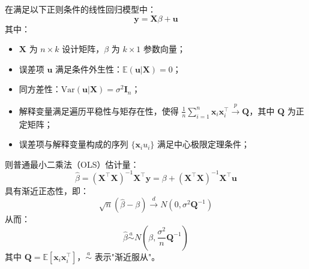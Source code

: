 \begin{theorem}[大样本OLS估计量的渐近正态性]
在满足以下正则条件的线性回归模型中：
\begin{equation}
\mathbf{y} = \mathbf{X}\beta + \mathbf{u}
\end{equation}
其中：
\begin{itemize}
    \item $\mathbf{X}$ 为 $n \times k$ 设计矩阵，$\beta$ 为 $k \times 1$ 参数向量；
    \item 误差项 $\mathbf{u}$ 满足条件外生性：$\mathbb{E}(\mathbf{u}|\mathbf{X}) = 0$；
    \item 同方差性：$\text{Var}(\mathbf{u}|\mathbf{X}) = \sigma^2 \mathbf{I}_n$；
    \item 解释变量满足遍历平稳性与矩存在性，使得 $\frac{1}{n} \sum_{i=1}^n \mathbf{x}_i \mathbf{x}_i^\top \overset{p}{\to} \mathbf{Q}$，其中 $\mathbf{Q}$ 为正定矩阵；
    \item 误差项与解释变量构成的序列 $\{\mathbf{x}_i u_i\}$ 满足中心极限定理条件；
\end{itemize}

则普通最小二乘法（OLS）估计量：
\begin{equation}
\hat{\beta} = (\mathbf{X}^\top \mathbf{X})^{-1} \mathbf{X}^\top \mathbf{y} = \beta + (\mathbf{X}^\top \mathbf{X})^{-1} \mathbf{X}^\top \mathbf{u}
\end{equation}
具有渐近正态性，即：
\begin{equation}
\sqrt{n}(\hat{\beta} - \beta) \overset{d}{\to} N(0, \sigma^2 \mathbf{Q}^{-1})
\end{equation}
从而：
\begin{equation}
\hat{\beta} \overset{a}{\sim} N\left( \beta, \frac{\sigma^2}{n} \mathbf{Q}^{-1} \right)
\end{equation}
其中 $\mathbf{Q} = \mathbb{E}[\mathbf{x}_i \mathbf{x}_i^\top]$，$\overset{a}{\sim}$ 表示"渐近服从"。
\end{theorem}

